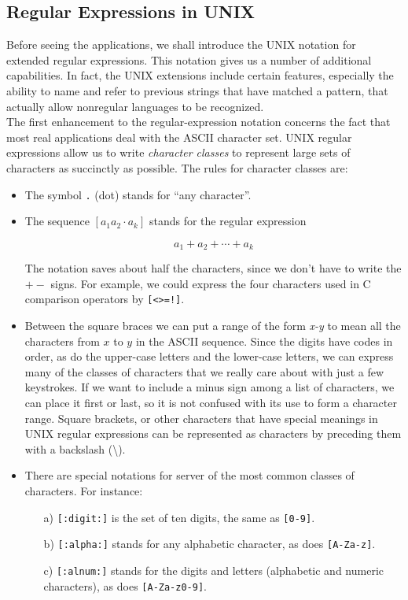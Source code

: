 \documentclass[]{article}
\begin{document}
  \subsection*{Regular Expressions in UNIX}
    Before seeing the applications, we shall introduce the UNIX notation for
    extended regular expressions. This notation gives us a number of additional
    capabilities. In fact, the UNIX extensions include certain features,
    especially the ability to name and refer to previous strings that have
    matched a pattern, that actually allow nonregular languages to be
    recognized. \\
    \indent The first enhancement to the regular-expression notation concerns
    the fact that most real applications deal with the ASCII character set. UNIX
    regular expressions allow us to write \emph{character classes} to represent
    large sets of characters as succinctly as possible. The rules for character
    classes are:
      \begin{itemize}
        \item The symbol \texttt{.} (dot) stands for ``any character''.
        \item The sequence $[a_1a_2\cdot{}a_k]$ stands for the regular
        expression

          \[ a_1 + a_2 + \cdots + a_k \]

        The notation saves about half the characters, since we don't have to
        write the $+-$ signs. For example, we could express the four characters
        used in C comparison operators by \texttt{[<>=!]}.
        \item Between the square braces we can put a range of the form
        \emph{x-y} to mean all the characters from $x$ to $y$ in the ASCII
        sequence. Since the digits have codes in order, as do the upper-case
        letters and the lower-case letters, we can express many of the classes
        of characters that we really care about with just a few keystrokes. If
        we want to include a minus sign among a list of characters, we can place
        it first or last, so it is not confused with its use to form a character
        range. Square brackets, or other characters that have special meanings
        in UNIX regular expressions can be represented as characters by
        preceding them with a backslash (\textbackslash).
        \item There are special notations for server of the most common classes
        of characters. For instance:
        \begin{enumerate}
          \item[a)] \texttt{[:digit:]} is the set of ten digits, the same as
          \texttt{[0-9]}.
          \item[b)] \texttt{[:alpha:]} stands for any alphabetic character, as
          does \texttt{[A-Za-z]}.
          \item[c)] \texttt{[:alnum:]} stands for the digits and letters
          (alphabetic and numeric characters), as does \texttt{[A-Za-z0-9]}.
        \end{enumerate}
      \end{itemize}
\end{document}
